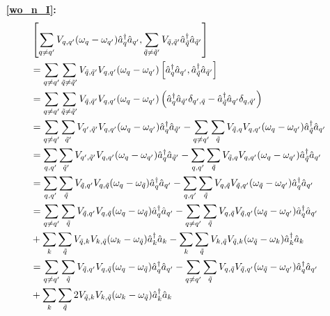 \begin{appendix}
\begin{itemize}
\item [\textbf{\ref{wo_n_I}:}] \begin{align}&\left[\Sum_{q\neq q^\prime}V_{q,q^\prime}(\omega_q-\omega_{q^\prime})\CR_q\AN_{q^\prime} , \Sum_{\tilde q\neq \tilde q^\prime}V_{\tilde q,\tilde q^\prime}\CR_{\tilde q}\AN_{\tilde q^\prime} \right] \nonumber \\ \quad& = \Sum_{q\neq q^\prime}\Sum_{\tilde q\neq \tilde q^\prime}V_{\tilde q,\tilde q^\prime}V_{q,q^\prime}(\omega_q-\omega_{q^\prime})\left[\CR_q\AN_{q^\prime} , \CR_{\tilde q}\AN_{\tilde q^\prime} \right] \nonumber \\ \quad& =  \Sum_{q\neq q^\prime}\Sum_{\tilde q\neq \tilde q^\prime}V_{\tilde q,\tilde q^\prime}V_{q,q^\prime}(\omega_q-\omega_{q^\prime})\left(\CR_q\AN_{\tilde q^\prime}\delta_{q^\prime,\tilde q}-\CR_{\tilde q}\AN_{q^\prime}\delta_{q,\tilde q^\prime}\right) \nonumber \\ \quad& 
= \Sum_{q\neq q^\prime}\Sum_{\tilde q^\prime}V_{q^\prime,\tilde q^\prime}V_{q,q^\prime}(\omega_q-\omega_{q^\prime})\CR_q\AN_{\tilde q^\prime} - \Sum_{q\neq q^\prime}\Sum_{\tilde q}V_{\tilde q,q}V_{q,q^\prime}(\omega_q-\omega_{q^\prime})\CR_{\tilde q}\AN_{q^\prime} \nonumber \\ \quad& 
= \Sum_{q, q^\prime}\Sum_{\tilde q^\prime}V_{q^\prime,\tilde q^\prime}V_{q,q^\prime}(\omega_q-\omega_{q^\prime})\CR_q\AN_{\tilde q^\prime} - \Sum_{q,q^\prime}\Sum_{\tilde q}V_{\tilde q,q}V_{q,q^\prime}(\omega_q-\omega_{q^\prime})\CR_{\tilde q}\AN_{q^\prime} \nonumber \\ \quad& 
=  \Sum_{q, q^\prime}\Sum_{\tilde q}V_{\tilde q,q^\prime}V_{q,\tilde q}(\omega_q-\omega_{\tilde q})\CR_q\AN_{q^\prime} - \Sum_{q,q^\prime}\Sum_{\tilde q}V_{q,\tilde q}V_{\tilde q,q^\prime}(\omega_{\tilde q}-\omega_{q^\prime})\CR_{q}\AN_{q^\prime} \nonumber \\ \quad& 
=\Sum_{q\neq q^\prime}\Sum_{\tilde q}V_{\tilde q,q^\prime}V_{q,\tilde q}(\omega_q-\omega_{\tilde q})\CR_q\AN_{q^\prime} - \Sum_{q\neq q^\prime}\Sum_{\tilde q}V_{q,\tilde q}V_{\tilde q,q^\prime}(\omega_{\tilde q}-\omega_{q^\prime})\CR_{q}\AN_{q^\prime} \nonumber \\ \quad& + \Sum_{k}\Sum_{\tilde q}V_{\tilde q,k}V_{k,\tilde q}(\omega_k-\omega_{\tilde q})\CR_k\AN_{k} - \Sum_{k}\Sum_{\tilde q}V_{k,\tilde q}V_{\tilde q,k}(\omega_{\tilde q}-\omega_{k})\CR_{k}\AN_{k} \nonumber \\ \quad& 
=\Sum_{q\neq q^\prime}\Sum_{\tilde q}V_{\tilde q,q^\prime}V_{q,\tilde q}(\omega_q-\omega_{\tilde q})\CR_q\AN_{q^\prime} - \Sum_{q\neq q^\prime}\Sum_{\tilde q}V_{q,\tilde q}V_{\tilde q,q^\prime}(\omega_{\tilde q}-\omega_{q^\prime})\CR_{q}\AN_{q^\prime} \nonumber \\ \quad& + \Sum_{k}\Sum_{\tilde q}2V_{\tilde q,k}V_{k,\tilde q}(\omega_k-\omega_{\tilde q})\CR_k\AN_{k}

\end{align}
\end{itemize}
\end{appendix}
